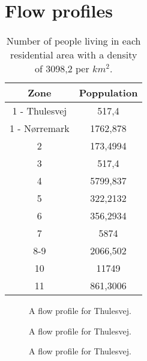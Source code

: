 \section{Flow profiles}\label{app:flow_profiles}



\begin{table}[]
\centering
\begin{tabular}{|c|c|}
\hline
\textbf{Zone} & \textbf{Poppulation} \\ \hline
1 - Thulesvej & 517,4                \\ \hline
1 - Nørremark & 1762,878             \\ \hline
2             & 173,4994             \\ \hline
3             & 517,4                \\ \hline
4             & 5799,837             \\ \hline
5             & 322,2132             \\ \hline
6             & 356,2934             \\ \hline
7             & 5874                 \\ \hline
8-9           & 2066,502             \\ \hline
10            & 11749                \\ \hline
11            & 861,3006             \\ \hline
\end{tabular}
\caption{Number of people living in each residential area with a density of 3098,2 per $km^2$.}
\label{tab:population_in_the_residential_area}
\end{table}

\begin{figure}[H]
\centering

\caption{A flow profile for Thulesvej.}
\label{fig:flow_profile_thulevej}
\end{figure} 

\begin{figure}[H]
\centering

\caption{A flow profile for Thulesvej.}
\label{fig:flow_profile_thulevej}
\end{figure} 

\begin{figure}[H]
\centering

\caption{A flow profile for Thulesvej.}
\label{fig:flow_profile_thulevej}
\end{figure} 

